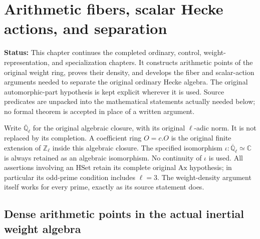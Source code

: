 \documentclass[11pt,a4paper]{article}
\numberwithin{equation}{section}
\theoremstyle{remark}\newtheorem{remark}[theorem]{Remark}
\newcommand{\status}[1]{\textbf{Status:} #1}
\begin{document}
\section{Arithmetic fibers, scalar Hecke actions, and separation}
\label{sec:arithmetic-fibers-v43}

\status{This chapter continues the completed ordinary, control,
weight-representation, and specialization chapters.  It constructs
arithmetic points of the original weight ring, proves their density,
and develops the fiber and scalar-action arguments needed to separate
the original ordinary Hecke algebra.  The original automorphic-part
hypothesis is kept explicit wherever it is used.  Source predicates
are unpacked into the mathematical statements actually needed below;
no formal theorem is accepted in place of a written argument.}

Write $\overline{\mathbb Q}_\ell$ for the original algebraic closure,
with its original $\ell$-adic norm.  It is not replaced by its
completion.  A coefficient ring $O=c.O$ is the original finite
extension of $\mathbb Z_\ell$ inside this algebraic closure.  The
specified isomorphism $\iota:\overline{\mathbb Q}_\ell\simeq\mathbb C$
is always retained as an algebraic isomorphism.  No continuity of
$\iota$ is used.  All assertions involving an $\mathrm{HSet}$ retain
its complete original $\mathrm{Ax}$ hypothesis; in particular its
odd-prime condition includes $\ell=3$.  The weight-density argument
itself works for every prime, exactly as its source statement does.

\subsection{Dense arithmetic points in the actual inertial weight algebra}

\end{document}
